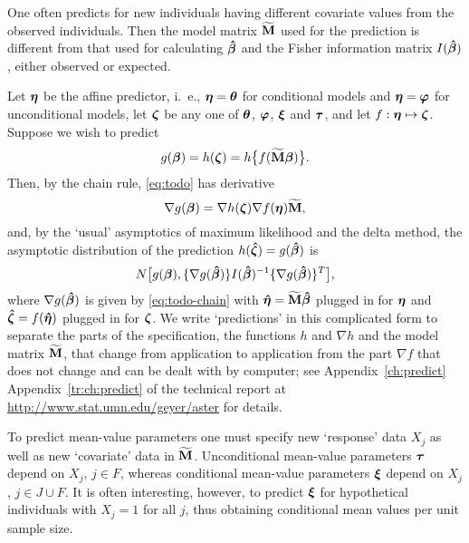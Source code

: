 One often predicts for new
individuals having different covariate values from the observed individuals.
Then the model matrix $\widetilde{\mathbf{M}}$ used for the prediction is different from
that used for calculating ${\boldsymbol{\hat{\beta}}}$ and the Fisher
information matrix $I({\boldsymbol{\hat{\beta}}})$, either observed or expected.

Let ${\boldsymbol{\eta}}$ be the affine predictor, i.~e.,
${\boldsymbol{\eta}} = {\boldsymbol{\theta}}$ for conditional models and
${\boldsymbol{\eta}} = {\boldsymbol{\varphi}}$ for unconditional models,
let ${\boldsymbol{\zeta}}$ be any one of ${\boldsymbol{\theta}}$, ${\boldsymbol{\varphi}}$,
${\boldsymbol{\xi}}$ and ${\boldsymbol{\tau}}$, and let $f : {\boldsymbol{\eta}} \mapsto {\boldsymbol{\zeta}}$.
Suppose we wish to predict
\begin{equation} \label{eq:todo}
    g({\boldsymbol{\beta}})
    =
    h({\boldsymbol{\zeta}})
    =
    h\bigl\{ f(\widetilde{\mathbf{M}} {\boldsymbol{\beta}}) \bigr\}.
\end{equation}
Then, by the chain rule, \eqref{eq:todo} has derivative
\begin{equation} \label{eq:todo-chain}
    \nabla g({\boldsymbol{\beta}})
    =
    \nabla h({\boldsymbol{\zeta}}) \nabla f({\boldsymbol{\eta}})
    \widetilde{\mathbf{M}},
\end{equation}
and, by the `usual' asymptotics of maximum likelihood and the delta method,
the asymptotic distribution of
the prediction $h({\boldsymbol{\hat{\zeta}}}) = g({\boldsymbol{\hat{\beta}}})$ is
$$
   N\bigl[g({\boldsymbol{\beta}}),
   \{\nabla g({\boldsymbol{\hat{\beta}}})\} I({\boldsymbol{\hat{\beta}}})^{-1} \{\nabla g({\boldsymbol{\hat{\beta}}})\}^T
   \bigr],
$$
where $\nabla g({\boldsymbol{\hat{\beta}}})$ is given by \eqref{eq:todo-chain}
with ${\boldsymbol{\hat{\eta}}} = \widetilde{\mathbf{M}} {\boldsymbol{\hat{\beta}}}$ plugged in for ${\boldsymbol{\eta}}$
and ${\boldsymbol{\hat{\zeta}}} = f({\boldsymbol{\hat{\eta}}})$
plugged in for ${\boldsymbol{\zeta}}$.
We write `predictions' in this complicated form to
separate the parts of the specification,
the functions $h$ and $\nabla h$ and the model matrix $\widetilde{\mathbf{M}}$,
that change from application to application from the part
$\nabla f$ that does not change and can
be dealt with by computer; see
{Appendix~\ref{ch:predict}}
{Appendix~\ref{tr:ch:predict} of
the technical report at \url{http://www.stat.umn.edu/geyer/aster}}
for details.

To predict mean-value parameters one
must specify new `response' data $X_j$ as well as new `covariate'
data in $\widetilde{\mathbf{M}}$.
Unconditional mean-value parameters ${\boldsymbol{\tau}}$ depend on
$X_j$, $j \in F$, whereas
conditional mean-value parameters ${\boldsymbol{\xi}}$ depend on
$X_j$, $j \in J \cup F$.
It is often interesting, however, to predict ${\boldsymbol{\xi}}$ for hypothetical
individuals with $X_j = 1$ for all $j$, thus obtaining conditional mean
values per unit sample size.

